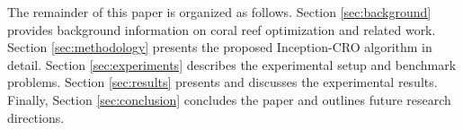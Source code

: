 The remainder of this paper is organized as follows. Section \ref{sec:background} provides background information on coral reef optimization and related work. Section \ref{sec:methodology} presents the proposed Inception-CRO algorithm in detail. Section \ref{sec:experiments} describes the experimental setup and benchmark problems. Section \ref{sec:results} presents and discusses the experimental results. Finally, Section \ref{sec:conclusion} concludes the paper and outlines future research directions.
